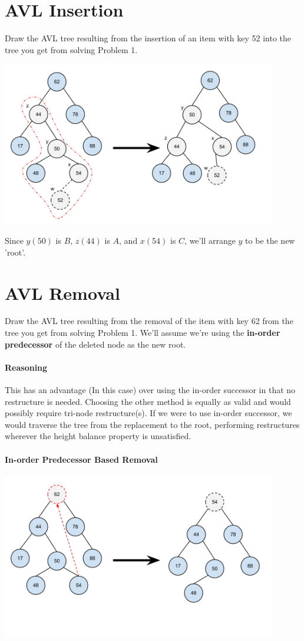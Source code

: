 \documentclass[12pt]{article}
\begin{document}
\section{AVL Insertion}
Draw the AVL tree resulting from the insertion of an item with key 52 into the tree you get from solving Problem 1.
\begin{center}
\includegraphics[width=0.9\textwidth]{figures/bst-insert.png}
\end{center}
Since $y(50)$ is $B$, $z(44)$ is $A$, and $x(54)$ is $C$, we'll arrange $y$ to be the new 'root'.
\section{AVL Removal}
Draw the AVL tree resulting from the removal of the item with key 62 from the tree you get from solving Problem  1.
We'll assume we're using the {\bf in-order predecessor} of the deleted node as the new root.
\paragraph{Reasoning}
This has an advantage (In this case) over using the in-order successor in that no restructure is needed. Choosing the other method is equally as valid and would possibly require tri-node restructure(s).
If we were to use in-order successor, we would traverse the tree from the replacement to the root, performing restructures wherever the height balance property is unsatisfied.

\paragraph{In-order Predecessor Based Removal}
\begin{center}
\includegraphics[width=0.9\textwidth]{figures/bst-remove.png}
\end{center}
\end{document}

